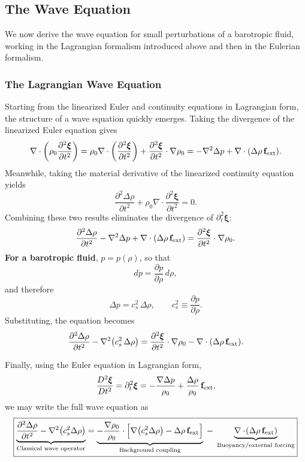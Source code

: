 \subsection{The Wave Equation}

We now derive the wave equation for small perturbations of a barotropic fluid,  working in the Lagrangian formalism introduced above and then in the Eulerian formalism.

\subsubsection*{The Lagrangian Wave Equation}

Starting from the linearized Euler and continuity equations in Lagrangian form, 
the structure of a wave equation quickly emerges. Taking the divergence of the 
linearized Euler equation gives
\[
\nabla \cdot \left(\rho_0 \frac{\partial^2 \boldsymbol{\xi}}{\partial t^2}\right) 
= \rho_0 \nabla\cdot\left(\frac{\partial^2\boldsymbol{\xi}}{\partial t^2}\right) 
+ \frac{\partial^2\boldsymbol{\xi}}{\partial t^2} \cdot \nabla \rho_0
= - \nabla^2 \Delta p + \nabla \cdot (\Delta \rho\, {\bf f}_{\rm ext}).
\]
Meanwhile, taking the material derivative of the linearized continuity equation yields
\[
\frac{\partial ^2 \Delta \rho}{\partial t^2} 
+ \rho_0 \nabla \cdot \frac{\partial ^2\boldsymbol{\xi}}{\partial t^2} = 0.
\]
Combining these two results eliminates the divergence of $\partial_t^2 \boldsymbol{\xi}$:
\[
\frac{\partial^2 \Delta \rho}{\partial t^2} 
- \nabla^2 \Delta p 
+ \nabla \cdot (\Delta \rho\, {\bf f}_{\rm ext})
= \frac{\partial^2 \boldsymbol{\xi}}{\partial t^2} \cdot \nabla \rho_0.
\]
\textbf{For a barotropic fluid}, $p=p(\rho)$, so that
\[
dp = \frac{\partial p}{\partial \rho}\, d\rho,
\]
and therefore
\[
\Delta p = c_s^2\, \Delta \rho, \qquad
c_s^2 \equiv \frac{\partial p}{\partial \rho}.
\]
Substituting, the equation becomes
\[
\frac{\partial^2 \Delta \rho}{\partial t^2}
- \nabla^2 \!\left(c_s^2\, \Delta \rho\right)
= \frac{\partial^2 \boldsymbol{\xi}}{\partial t^2} \cdot \nabla \rho_0
- \nabla \cdot (\Delta \rho\, {\bf f}_{\rm ext}).
\]

Finally, using the Euler equation in Lagrangian form,
\[
\frac{D^2 \boldsymbol{\xi}}{Dt^2}
= \partial_t^2 \boldsymbol{\xi}
= -\frac{\nabla \Delta p}{\rho_0}
+ \frac{\Delta \rho}{\rho_0}\, {\bf f}_{\rm ext},
\]
we may write the full wave equation as
\begin{equation}
    \label{eq:lagrangian_wave_equation}
    \boxed{
    \underbrace{\frac{\partial^2 \Delta \rho}{\partial t^2} 
    - \nabla^2 \!\left(c_s^2 \Delta \rho\right)}_{\text{Classical wave operator}}
    =
    \underbrace{- \frac{\nabla \rho_0}{\rho_0} \cdot 
    \Big[\nabla \!\left(c_s^2 \Delta \rho\right) 
    - \Delta \rho\, {\bf f}_{\rm ext} \Big]}_{\text{Background coupling}}
    \;-\;
    \underbrace{\nabla \cdot \!\left(\Delta \rho\, {\bf f}_{\rm ext}\right)}_{\text{Buoyancy/external forcing}}
    }
\end{equation}

